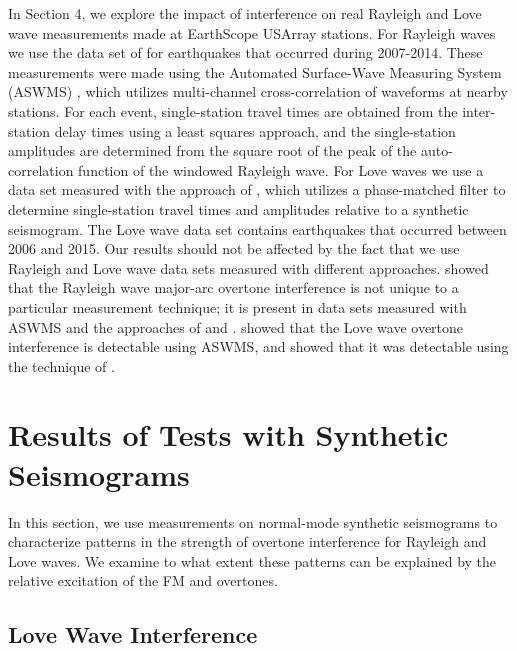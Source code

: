 \documentclass[extra,mreferee]{gji}
\begin{document}
In Section 4, we explore the impact of interference on real Rayleigh and Love wave measurements made at EarthScope USArray stations. 
For Rayleigh waves we use the data set of \citet{babikoff2019long} for earthquakes that occurred during 2007-2014. These measurements were made using the Automated Surface-Wave Measuring System (ASWMS) \citep{jingmcc}, which utilizes multi-channel cross-correlation of waveforms at nearby stations. For each event, single-station travel times are obtained from the inter-station delay times using a least squares approach, and the single-station amplitudes are determined from the square root of the peak of the auto-correlation function of the windowed Rayleigh wave. For Love waves we use a data set measured with the approach of \citet{ekstrom1997measurements}, which utilizes a phase-matched filter to determine single-station travel times and amplitudes relative to a synthetic seismogram. The Love wave data set contains earthquakes that occurred between 2006 and 2015. Our results should not be affected by the fact that we use Rayleigh and Love wave data sets measured with different approaches.  \citet{hariharan2020evidence} showed that the Rayleigh wave major-arc overtone interference is not unique to a particular measurement technique; it is present in data sets measured with ASWMS and the approaches of \citet{ekstrom1997measurements} and \citet{ma2014comprehensive}. \citet{jingmcc} showed that the Love wave overtone interference is detectable using ASWMS, and \citet{foster2014overtone} showed that it was detectable using the technique of \citet{ekstrom1997measurements}.

\section{Results of Tests with Synthetic Seismograms}

In this section, we use measurements on normal-mode synthetic seismograms to characterize patterns in the strength of overtone interference for Rayleigh and Love waves. We examine to what extent these patterns can be explained by the relative excitation of the FM and overtones. 
\subsection{Love Wave Interference}
 
\end{document}
